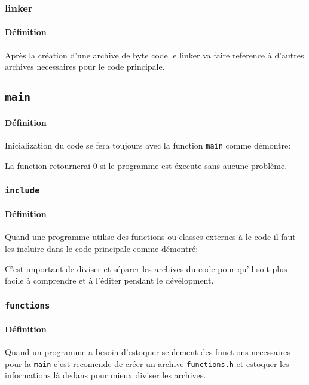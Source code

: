 \documentclass{article}
\begin{document}
\subsubsection{linker}
\paragraph{Définition}Après la création d'une archive de byte code le linker va faire reference à d'autres archives necessaires pour le code principale.

\subsection{\texttt{main}}
\paragraph{Définition}Inicialization du code se fera toujours avec la function \texttt{main} comme démontre:
\begin{scriptsize}
    \mycode
\end{scriptsize}
La function retournerai 0 si le programme est éxecute sans aucune problème.

\subsubsection{\texttt{include}}
\paragraph{Définition}Quand une programme utilise des functions ou classes externes à le code il faut les incluire dans le code principale comme démontré:
\begin{scriptsize}
    \mycode
\end{scriptsize}
C'est important de diviser et séparer les archives du code pour qu'il soit plus facile à comprendre et à l'éditer pendant le dévélopment.

\subsubsection{\texttt{functions}}
\paragraph{Définition}Quand un programme a besoin d'estoquer seulement des functions necessaires pour la \texttt{main} c'est recomende de créer un archive \texttt{functions.h} et estoquer les informations là dedans pour mieux diviser les archives.
\end{document}
